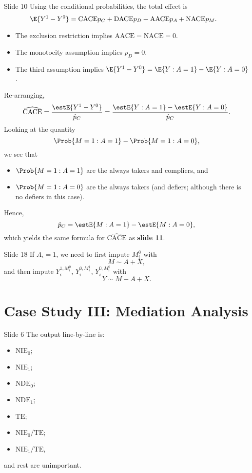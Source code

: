\begin{Regular}{Slide 10}
    Using the conditional probabilities, the total effect is
    \begin{align*}
        \E{Y^1-Y^0}
         & =\text{CACE}p_C+\text{DACE}p_D
        +\text{AACE}p_A+\text{NACE}p_M.
    \end{align*}
    \begin{itemize}
        \item The exclusion restriction implies
              $ \text{AACE}=\text{NACE}=0 $.
        \item The monotocity assumption implies $ p_D=0 $.
        \item The third assumption implies
              $ \E{Y^1-Y^0}=\E{Y\given A=1}-\E{Y\given A=0} $.
    \end{itemize}
    Re-arranging,
    \[ \widehat{\text{CACE}}=\frac{\estE{Y^1-Y^0}}{\hat{p}_C}
        =\frac{\estE{Y\given A=1}-\estE{Y\given A=0}}{\hat{p}_C}. \]
    Looking at the quantity
    \[ \Prob{M=1\given A=1}-\Prob{M=1\given A=0}, \]
    we see that
    \begin{itemize}
        \item $ \Prob{M=1\given A=1} $ are the always takers and compliers, and
        \item $ \Prob{M=1\given A=0} $ are the always takers (and defiers; although
              there is no defiers in this case).
    \end{itemize}
    Hence,
    \[ \hat{p}_C=\estE{M\given A=1}-\estE{M\given A=0}, \]
    which yields the same formula for $ \widehat{\text{CACE}} $ as \textbf{slide 11}.
\end{Regular}
\begin{Regular}{Slide 18}
    If $ A_i=1 $, we need to first impute $ M_i^0 $ with
    \[ M \sim A+X, \]
    and then impute
    $ Y_i^{1,M_i^0} $, $ Y_i^{0,M_i^1} $, $ Y_i^{0,M_i^0} $
    with
    \[ Y \sim M+A+X. \]
\end{Regular}
\section*{Case Study III\@: Mediation Analysis}
\begin{Regular}{Slide 6}
    The output line-by-line is:
    \begin{itemize}
        \item $ \text{NIE}_0 $;
        \item $ \text{NIE}_1 $;
        \item $ \text{NDE}_0 $;
        \item $ \text{NDE}_1 $;
        \item $ \text{TE} $;
        \item $ \text{NIE}_0/\text{TE} $;
        \item $ \text{NIE}_1/\text{TE} $,
    \end{itemize}
    and rest are unimportant.
\end{Regular}